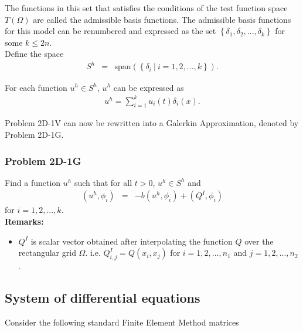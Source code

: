 \documentclass[../../main.tex]{subfiles}
\begin{document}
The functions in this set that satisfies the conditions of the test function space $T(\Omega)$ are called the admissible basis functions. The admissible basis functions for this model can be renumbered and expressed as the set $\left \{\delta_1, \delta_2,..., \delta_k \right\}$ for some $k \leq 2n$.\\

Define the space
\begin{eqnarray*}
S^h & = & \textrm{span}\left(\left\{\delta_i \ | \ i = 1,2,...,k \right\} \right).
\end{eqnarray*}

For each function $u^h \in S^h$, $u^h$ can be expressed as
\begin{eqnarray*}
	u^h = \sum_{i = 1}^{k} u_i(t) \delta_{i}(x).
\end{eqnarray*}

Problem 2D-1V can now be rewritten into a Galerkin Approximation, denoted by Problem 2D-1G.

\subsubsection{Problem 2D-1G}
Find a function $u^h$ such that for all $t>0$, $u^h \in S^h$ and
\begin{eqnarray*}
	(u^h, \phi_i) & = & -b(u^h,\phi_i) + (Q^I, \phi_i)
\end{eqnarray*} for $i = 1,2,...,k$.\\

\textbf{Remarks:}
\begin{itemize}
	\item[] $Q^I$ is scalar vector obtained after interpolating the function $Q$ over the rectangular grid $\Omega$. i.e. $Q^I_{i,j} = Q(x_i,x_j)$ for $i = 1,2,...,n_1$ and $j = 1,2,...,n_2$.
\end{itemize}

\subsection{System of differential equations}\label{ssec:2DFEM:DE}

Consider the following standard Finite Element Method matrices
\end{document}

